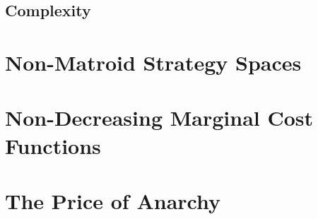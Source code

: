\documentclass{tufte-handout}
\begin{document}
  \subsection{Complexity}
  \vspace{2cm}

\section{Non-Matroid Strategy Spaces}
  \vspace{2cm}

\section{Non-Decreasing Marginal Cost Functions}
  \vspace{2cm}

\section{The Price of Anarchy}
  \vspace{2cm}
\end{document}
